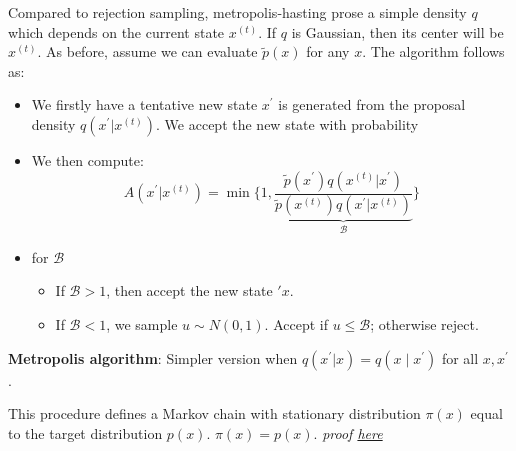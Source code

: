 Compared to rejection sampling, metropolis-hasting prose a simple density $q$ which depends on the current state $x^{(t)}$. If $q$ is Gaussian, then its center will be $x^{(t)}$. As before, assume we can evaluate $\tilde{p}(x)$ for any $x$. The algorithm follows as:
\begin{itemize}
    \item We firstly have a tentative new state $x^{\prime}$ is generated from the proposal density $q\left(x^{\prime} | x^{(t)}\right)$. We accept the new state with probability
    \item We then compute:
    $$
    A\left(x^{\prime}|x^{(t)}\right)=\min \Biggl\{1, \underbrace{\frac{\tilde{p}\left(x^{\prime}\right) q\left(x^{(t)}|x^{\prime}\right)}{\tilde{p}\left(x^{(t)}\right) q\left(x^{\prime} | x^{(t)}\right)}}_{\mathcal{B}}\Biggl\}
    $$
    \item for $\mathcal{B}$
    \begin{itemize}
        \item If $\mathcal{B}>1$, then accept the new state $\prime{x}$.
        \item If $\mathcal{B}<1$, we sample $u\sim N(0,1)$. Accept if $u\leq\mathcal{B}$; otherwise reject.
    \end{itemize}
\end{itemize}
\textbf{Metropolis algorithm}: Simpler version when $q\left(x^{\prime} | x\right)=q\left(x \mid x^{\prime}\right)$ for all $x, x^{\prime}$.
\begin{theorem}
    This procedure defines a Markov chain with stationary distribution $\pi(x)$ equal to the target distribution $p(x)$. $\pi(x)=p(x)$. \textit{proof \hyperref[sec:proof-metro]{here}}
\end{theorem}

